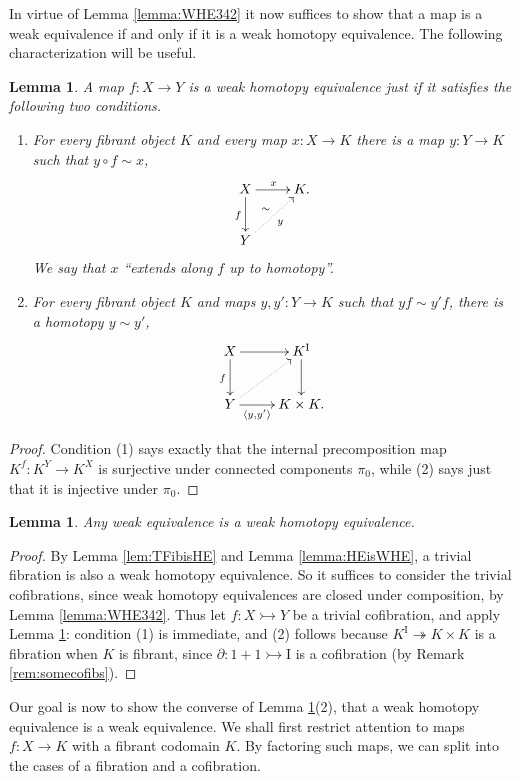 \documentclass[11pt,reqno]{amsart}
\newcommand{\mono}{\ensuremath{\rightarrowtail}}
\newcommand{\ra}{\ensuremath{\rightarrow}}
\newcommand{\cof}{\ensuremath{\rightarrowtail}}
\newcommand{\fib}{\ensuremath{\twoheadrightarrow}}
\renewcommand{\to}{\ensuremath{\rightarrow}}
\newcommand{\I}{\ensuremath{\mathrm{I}}}
\newcommand{\del}{\ensuremath{\partial}}
\newtheorem{lemma}[theorem]{Lemma}
\theoremstyle{remark}
\theoremstyle{definition}
\begin{document}
In virtue of Lemma \ref{lemma:WHE342} it now suffices to show that a map is a weak equivalence if and only if it is a weak homotopy equivalence.   The following characterization will be useful.

\begin{lemma}\label{lem:WHEunwound}
A map $f : X\ra Y$ is a weak homotopy equivalence just if it satisfies the following two conditions.
\begin{enumerate}
\item For every fibrant object $K$ and every map $x : X \ra K$ there is a map $y:Y\ra K$ such that $y\circ f \sim x$,
\[
\xymatrix{
X \ar[d]_{f} \ar[r]^{x}  & K.\\
Y \ar@{..>}[ru]_{y}^{\sim} &
}
\]
We say that $x$ ``extends along $f$ up to homotopy''.
\item For every fibrant object $K$ and maps $y, y' : Y \ra K$ such that $yf \sim y'f$, there is a homotopy $y\sim y'$,
\[
\xymatrix{
X \ar[d]_{f} \ar[r]  & K^\I\ar[d] \\
Y \ar@{..>}[ru] \ar[r]_-{\langle y,y'\rangle} & K\times K.
}
\]
\end{enumerate}
\end{lemma}
\begin{proof}
Condition (1) says exactly that the internal precomposition map $K^f : K^Y \ra K^X$ is surjective under connected components $\pi_0$, while (2) says just that it is injective under $\pi_0$.
\end{proof}

\begin{lemma}\label{lem:WEimpliesWHE}
Any weak equivalence is a weak homotopy equivalence.
\end{lemma}

\begin{proof}
By Lemma \ref{lem:TFibisHE} and Lemma \ref{lemma:HEisWHE}, a trivial fibration is also a weak homotopy equivalence. So it suffices to consider the trivial cofibrations, since weak homotopy equivalences are closed under composition, by Lemma \ref{lemma:WHE342}.   Thus let $f : X \mono Y$ be a trivial cofibration, and apply Lemma \ref{lem:WHEunwound}: condition (1) is immediate, and (2) follows because $K^\I \fib K\times K$ is a fibration when $K$ is fibrant, since $\del : 1+1 \cof \I$ is a cofibration (by Remark \ref{rem:somecofibs}).
\end{proof}

Our goal is now to show the converse of Lemma \ref{lem:WEimpliesWHE}(2), that a weak homotopy equivalence is a weak equivalence. We shall first restrict attention to maps $f : X\to K$ with a fibrant codomain $K$.  By factoring such maps, we can split into the cases of a fibration and a cofibration.  
\end{document}
